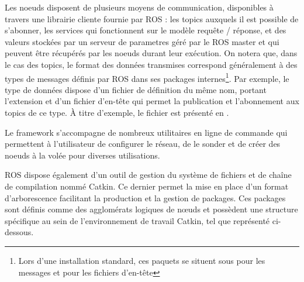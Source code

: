 Les noeuds disposent de plusieurs moyens de communication, disponibles à travers une librairie cliente fournie par \gls{ROS} : les \gls{topics}\cite{Bib_ROS_topics} auxquels il est possible de s'abonner, 
les \gls{services}\cite{Bib_ROS_services} qui fonctionnent sur le modèle requête / réponse, et des valeurs stockées par un \gls{serveur de parametres} géré par le \gls{ROS} master et qui peuvent être récupérés par les noeuds durant leur exécution.
On notera que, dans le cas des topics, le format des données transmises correspond généralement à des types de messages définis par \gls{ROS} dans ses packages 
internes\footnote{Lors d'une installation standard, ces paquets se situent sous  pour les messages et  pour les fichiers d'en-tête}. 
Par exemple, le type de données  dispose d'un fichier de définition du même nom, portant l'extension  et d'un fichier d'en-tête qui permet la publication et l'abonnement aux topics 
de ce type.
\`{A} titre d'exemple, le fichier  est présenté en .

Le framework s'accompagne de nombreux utilitaires en ligne de commande qui permettent à l'utilisateur de configurer le réseau, de le sonder et de créer des noeuds à la volée pour diverses utilisations.

\gls{ROS} dispose également d'un outil de gestion du système de fichiers et de cha\^{i}ne de compilation nommé \gls{Catkin}.
Ce dernier permet la mise en place d'un format d'arborescence facilitant la production et la gestion de packages.
Ces packages sont définis comme des agglomérats logiques de n\oe{}uds et possèdent une structure spécifique au sein de l'environnement de travail \gls{Catkin}, tel que représenté ci-dessous. 
\\
\renewcommand*\DTstylecomment{\rmfamily\color{red}}

